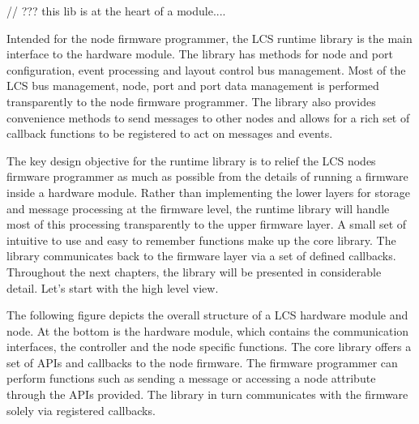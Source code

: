 
// ??? this lib is at the heart of a module....

Intended for the node firmware programmer, the LCS runtime library is the main interface to the hardware module. The library has methods for node and port configuration, event processing and layout control bus management. Most of the LCS bus management, node, port and port data management is performed transparently to the node firmware programmer. The library also provides convenience methods to send messages to other nodes and allows for a rich set of callback functions to be registered to act on messages and events.

The key design objective for the runtime library is to relief the LCS nodes firmware programmer as much as possible from the details of running a firmware inside a hardware module. Rather than implementing the lower layers for storage and message processing at the firmware level, the runtime library will handle most of this processing transparently to the upper firmware layer. A small set of intuitive to use and easy to remember functions make up the core library. The library communicates back to the firmware layer via a set of defined callbacks. Throughout the next chapters, the library will be presented in considerable detail. Let's start with the high level view.

The following figure depicts the overall structure of a LCS hardware module and node. At the bottom is the hardware module, which contains the communication interfaces, the controller and the node specific functions. The core library offers a set of APIs and callbacks to the node firmware. The firmware programmer can perform functions such as sending a message or accessing a node attribute through the APIs provided. The library in turn communicates with the firmware solely via registered callbacks.

